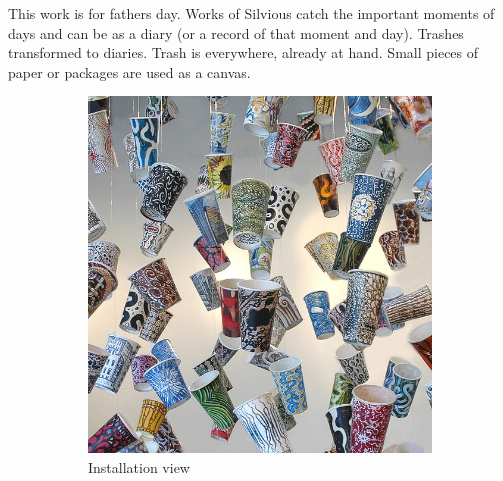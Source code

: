 This work is for fathers day. Works of Silvious catch the important moments of days and can be as a diary (or a record of that moment and day). Trashes transformed to diaries. Trash is everywhere, already at hand. Small pieces of paper or packages are used as a canvas. 

\begin{figure}[h!]
\centering
\begin{subfigure}{.47\textwidth}
  \centering
  \includegraphics[width=\linewidth]{graphics/Gwyneth-Leech-cup5.jpg}
  \caption{Installation view}
  \label{fig:GwynethLeech_Installation}
\end{subfigure}
\hfill
\begin{subfigure}{.47\textwidth}
  \centering

\end{subfigure}
\end{figure}
